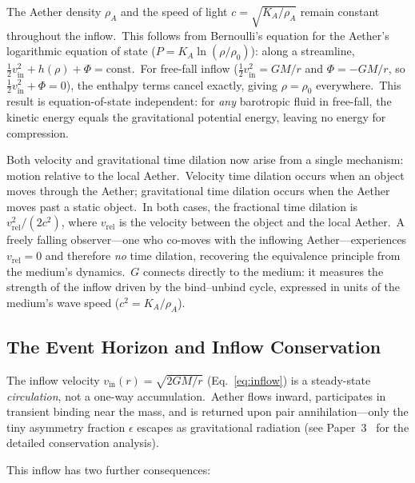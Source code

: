 ﻿\documentclass[12pt,letterpaper]{article}
\newcommand{\rhoa}{\rho_{\!A}}
\newcommand{\Ka}{K_{\!A}}
\newcommand{\vin}{v_{\mathrm{in}}}
\begin{document}
The Aether density $\rhoa$ and the speed of light $c = \sqrt{\Ka/\rhoa}$
remain constant throughout the inflow.\ This follows from Bernoulli's equation
for the Aether's logarithmic equation of state ($P = \Ka\ln(\rho/\rho_0)$):
along a streamline, $\tfrac{1}{2}\vin^2 + h(\rho) + \Phi = \mathrm{const}$.\
For free-fall inflow ($\tfrac{1}{2}\vin^2 = GM/r$ and $\Phi = -GM/r$,
so $\tfrac{1}{2}\vin^2 + \Phi = 0$), the enthalpy terms cancel exactly,
giving $\rho = \rho_0$ everywhere.\ This result is
equation-of-state independent: for \emph{any} barotropic fluid in free-fall,
the kinetic energy equals the gravitational potential energy, leaving no
energy for compression.

Both velocity and gravitational time dilation now arise from a single
mechanism: motion relative to the local Aether.\ Velocity time dilation
occurs when an object moves through the Aether; gravitational time dilation
occurs when the Aether moves past a static object.\ In both cases, the
fractional time dilation is $v_{\mathrm{rel}}^2/(2c^2)$, where
$v_{\mathrm{rel}}$ is the velocity between the object and the local Aether.\
A freely falling observer---one who co-moves with the inflowing
Aether---experiences $v_{\mathrm{rel}} = 0$ and therefore \emph{no} time
dilation, recovering the equivalence principle from the medium's dynamics.\
$G$ connects directly to the medium: it measures the strength of the inflow
driven by the bind--unbind cycle, expressed in units of the medium's wave
speed ($c^2 = \Ka/\rhoa$).


\subsection{The Event Horizon and Inflow Conservation}

The inflow velocity $\vin(r) = \sqrt{2GM/r}$ (Eq.~\ref{eq:inflow}) is a steady-state
\emph{circulation}, not a one-way accumulation.\ Aether flows inward, participates
in transient binding near the mass, and is returned upon pair annihilation---only
the tiny asymmetry fraction $\epsilon$ escapes as gravitational radiation (see
Paper~3~\cite{otto-gravity} for the detailed conservation analysis).

This inflow has two further consequences:
\end{document}
